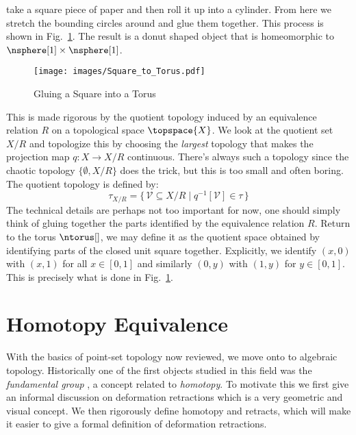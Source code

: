 \documentclass{book}                                                           %
\begin{document}
                take a square piece of paper and then roll it up into a
                cylinder. From here we stretch the bounding circles around and
                glue them together. This process is shown in
                Fig.~\ref{fig:Square_to_Torus}. The result is a donut shaped
                object that is homeomorphic to $\nsphere[1]\times\nsphere[1]$.
                \begin{figure}[H]
                    \centering
                    \captionsetup{type=figure}
                    \texttt{[image: images/Square\_to\_Torus.pdf]}
                    \caption{Gluing a Square into a Torus}
                    \label{fig:Square_to_Torus}
                \end{figure}
                This is made rigorous by the quotient topology induced by an
                equivalence relation $R$ on a topological space
                $\topspace{X}$. We look at the quotient
                set $X/R$ and topologize this by choosing the \textit{largest}
                topology that makes the projection map $q:X\rightarrow{X}/R$
                continuous. There's always such a topology since the chaotic
                topology $\{\emptyset,X/R\}$ does the trick, but this is too
                small and often boring. The quotient topology is defined by:%
                \begin{equation}
                    \tau_{X/R}=\{\,\mathcal{V}\subseteq{X}/R\;|\;
                        q^{\minus{1}}[\mathcal{V}]\in\tau\,\}
                \end{equation}
                The technical details are perhaps not too important for now, one
                should simply think of gluing together the parts identified by
                the equivalence relation $R$. Return to the torus $\ntorus[]$,
                we may define it as the quotient space obtained by identifying
                parts of the closed unit square together. Explicitly, we
                identify $(x,0)$ with $(x,1)$ for all $x\in[0,1]$ and similarly
                $(0,y)$ with $(1,y)$ for $y\in[0,1]$. This is precisely what is
                done in Fig.~\ref{fig:Square_to_Torus}.
        \section{Homotopy Equivalence}
            With the basics of point-set topology now reviewed, we move onto to
            algebraic topology. Historically one of the first objects studied in
            this field was the \textit{fundamental group}%
            , a concept related to \textit{homotopy}.
            To motivate this we first give an informal discussion on deformation
            retractions which is a very geometric and visual concept. We then
            rigorously define homotopy and retracts, which will make it easier
            to give a formal definition of deformation retractions.
\end{document}
